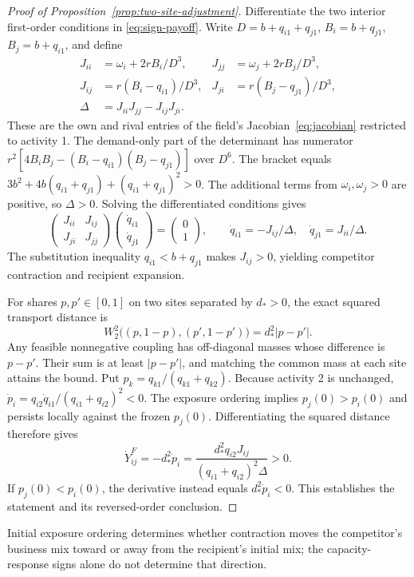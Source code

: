 \begin{proof}[Proof of Proposition~\ref{prop:two-site-adjustment}]
  Differentiate the two interior first-order conditions in
  \eqref{eq:sign-payoff}.
  Write $D=b+q_{i1}+q_{j1}$, $B_i=b+q_{j1}$, $B_j=b+q_{i1}$, and define
  \begin{equation}\label{eq:sign-jacobian}
    \begin{aligned}
      J_{ii}&=\omega_i+2rB_i/D^3,& J_{jj}&=\omega_j+2rB_j/D^3,\\
      J_{ij}&=r(B_i-q_{i1})/D^3,& J_{ji}&=r(B_j-q_{j1})/D^3,\\
      \Delta&=J_{ii}J_{jj}-J_{ij}J_{ji}.
    \end{aligned}
  \end{equation}
  These are the own and rival entries of the field's
  Jacobian~\eqref{eq:jacobian} restricted to activity 1.
  The demand-only part of the determinant has numerator
  $r^2[4{B_i}B_j-(B_i-q_{i1})(B_j-q_{j1})]$ over $D^6$.
  The bracket equals $3b^2+4b(q_{i1}+q_{j1})+(q_{i1}+q_{j1})^2>0$.
  The additional terms from $\omega_i,\omega_j>0$ are positive, so $\Delta>0$.
  Solving the differentiated conditions gives
  \begin{equation}\label{eq:sign-capacity}
    \begin{pmatrix}J_{ii}&J_{ij}\\J_{ji}&J_{jj}
    \end{pmatrix}
    \begin{pmatrix}\dot q_{i1}\\\dot q_{j1}
    \end{pmatrix}
    =
    \begin{pmatrix}0\\1
    \end{pmatrix},
    \qquad \dot q_{i1}=-J_{ij}/\Delta,\quad \dot q_{j1}=J_{ii}/\Delta.
  \end{equation}
  The substitution inequality $q_{i1}<b+q_{j1}$ makes $J_{ij}>0$, yielding
  competitor contraction and recipient expansion.

  For shares $p,p'\in[0,1]$ on two sites separated by $d_*>0$, the exact
  squared transport distance is
  \begin{equation}\label{eq:two-site-transport}
    W_2^2\bigl((p,1-p),(p',1-p')\bigr)=d_*^2|p-p'|.
  \end{equation}
  Any feasible nonnegative coupling has off-diagonal masses whose
  difference is $p-p'$.
  Their sum is at least $|p-p'|$, and matching the common mass at each site
  attains the bound.
  Put $p_k=q_{k1}/(q_{k1}+q_{k2})$.
  Because activity 2 is unchanged,
  $\dot p_i=q_{i2}\dot q_{i1}/(q_{i1}+q_{i2})^2<0$.
  The exposure ordering implies $p_j(0)>p_i(0)$ and persists locally against
  the frozen $p_j(0)$.
  Differentiating the squared distance therefore gives
  \begin{equation}\label{eq:sign-distance}
    \dot Y^F_{ij}=-d_*^2\dot p_i
    =\frac{d_*^2{q_{i2}}J_{ij}}{(q_{i1}+q_{i2})^2\Delta}>0.
  \end{equation}
  If $p_j(0)<p_i(0)$, the derivative instead equals $d_*^2\dot p_i<0$.
  This establishes the statement and its reversed-order conclusion.
\end{proof}

Initial exposure ordering determines whether contraction moves the
competitor's business mix toward or away from the recipient's initial mix;
the capacity-response signs alone do not determine that direction.
